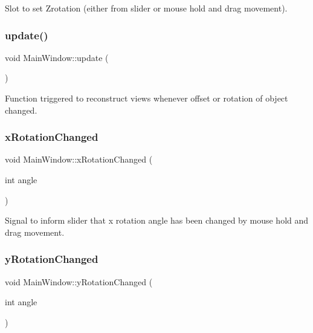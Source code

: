 Slot to set Zrotation (either from slider or mouse hold and drag movement). 

\mbox{\label{classMainWindow_a128f71880d4b9683149023fc46fcc9f8}} 
\subsubsection{\texorpdfstring{update()}{update()}}
{\footnotesize\ttfamily void Main\+Window\+::update (\begin{DoxyParamCaption}{ }\end{DoxyParamCaption})}



Function triggered to reconstruct views whenever offset or rotation of object changed. 

\mbox{\label{classMainWindow_a752903ab754e432c12f954ea872c854c}} 
\subsubsection{\texorpdfstring{x\+Rotation\+Changed}{xRotationChanged}}
{\footnotesize\ttfamily void Main\+Window\+::x\+Rotation\+Changed (\begin{DoxyParamCaption}\item[{int}]{angle }\end{DoxyParamCaption})\hspace{0.3cm}{\ttfamily [signal]}}



Signal to inform slider that x rotation angle has been changed by mouse hold and drag movement. 

\mbox{\label{classMainWindow_a4c0058cde1d49828b803919dfbf771c4}} 
\subsubsection{\texorpdfstring{y\+Rotation\+Changed}{yRotationChanged}}
{\footnotesize\ttfamily void Main\+Window\+::y\+Rotation\+Changed (\begin{DoxyParamCaption}\item[{int}]{angle }\end{DoxyParamCaption})\hspace{0.3cm}{\ttfamily [signal]}}



